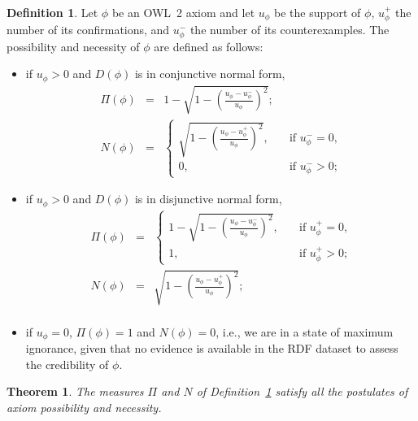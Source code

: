 \documentclass[review]{elsarticle}
\newtheorem{theorem}{Theorem}
\theoremstyle{definition}
\newtheorem{definition}{Definition}
\begin{document}
\begin{definition}\label{def:axiom-poss-nec}
  Let $\phi$ be an OWL~2 axiom and let $u_\phi$ be the support of $\phi$,
  $u_\phi^+$ the number of its confirmations, and
  $u_\phi^-$ the number of its counterexamples. The possibility and necessity of $\phi$
  are defined as follows:
  \begin{itemize}
  \item if $u_\phi > 0$ and $D(\phi)$ is in conjunctive normal form,
\begin{eqnarray}
  \label{eq:poss-conj}
  \Pi(\phi) &=& 1 - \sqrt{1 - \left(\frac{u_\phi - u_\phi^-}{u_\phi}\right)^2}; \\
  \label{eq:nec-conj}
  N(\phi) &=& \left\{\begin{array}{ll}
    \sqrt{1 - \left(\frac{u_\phi - u_\phi^+}{u_\phi}\right)^2},\quad & \mbox{if $u_\phi^- = 0$,}\\[1.5em]
    0, & \mbox{if $u_\phi^- > 0$;}
  \end{array}\right.
\end{eqnarray}
\item if $u_\phi > 0$ and $D(\phi)$ is in disjunctive normal form,
\begin{eqnarray}
  \label{eq:poss-disj}
  \Pi(\phi) &=& \left\{\begin{array}{ll}
    1 - \sqrt{1 - \left(\frac{u_\phi - u_\phi^-}{u_\phi}\right)^2},\quad & \mbox{if $u_\phi^+ = 0$,}\\[1.5em]
    1, & \mbox{if $u_\phi^+ > 0$;}
  \end{array}\right. \\
  \label{eq:nec-disj}
  N(\phi) &=& \sqrt{1 - \left(\frac{u_\phi - u_\phi^+}{u_\phi}\right)^2}; \\
\end{eqnarray}
\item if $u_\phi = 0$, $\Pi(\phi) = 1$ and $N(\phi) = 0$,
  i.e., we are in a state of maximum ignorance, given that no evidence is available
  in the RDF dataset to assess the credibility of $\phi$.
\end{itemize}
\end{definition}

\begin{theorem}
The measures $\Pi$ and $N$ of Definition~\ref{def:axiom-poss-nec} satisfy all the postulates   of axiom possibility and necessity.
\end{theorem}
\end{document}
